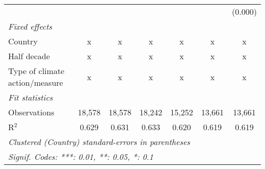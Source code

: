 \begin{tabular}{lcccccc}
                                                    &              &             &              &                &                & (0.000)\\   
   \emph{Fixed effects}\\
   Country                                          & x            & x           & x            & x              & x              & x\\  
   Half decade                                      & x            & x           & x            & x              & x              & x\\  
   Type of climate action/measure                   & x            & x           & x            & x              & x              & x\\  
   \midrule \emph{Fit statistics}\\
   Observations                                     & 18,578       & 18,578      & 18,242       & 15,252         & 13,661         & 13,661\\  
   R$^2$                                            & 0.629        & 0.631       & 0.633        & 0.620          & 0.619          & 0.619\\  
   \midrule
   \multicolumn{7}{l}{\emph{Clustered (Country) standard-errors in parentheses}}\\
   \multicolumn{7}{l}{\emph{Signif. Codes: ***: 0.01, **: 0.05, *: 0.1}}\\
\end{tabular}
\par\endgroup


